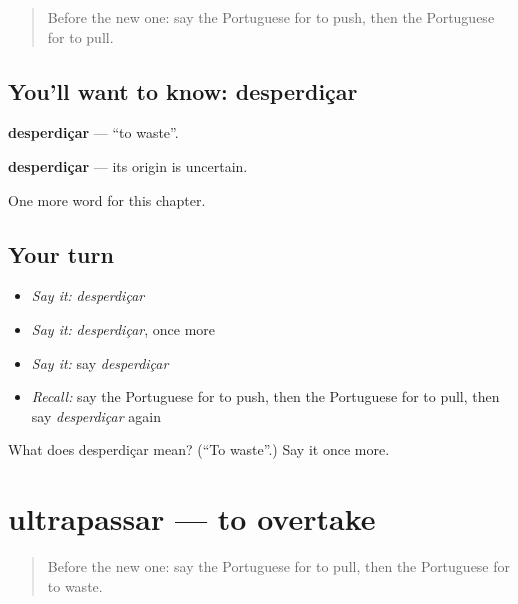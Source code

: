 \label{lesson:PT-C236-desperdicar}



\begin{quote}
Before the new one: say the Portuguese for to push, then the Portuguese for to pull.
\end{quote}

\subsection*{You'll want to know: desperdiçar}
\textbf{desperdiçar} — \textquotedblleft{}to waste\textquotedblright{}.

\begin{cousinweb}
\textbf{desperdiçar} — its origin is uncertain.
\end{cousinweb}

\begin{grammarlens}[title={What you've built}]
One more word for this chapter.
\end{grammarlens}

\subsection*{Your turn}
\begin{itemize}
\raggedright
  \item \emph{Say it:} \emph{desperdiçar}
  \item \emph{Say it:} \emph{desperdiçar}, once more
  \item \emph{Say it:} say \emph{desperdiçar}
  \item \emph{Recall:} say the Portuguese for to push, then the Portuguese for to pull, then say \emph{desperdiçar} again
\end{itemize}

\begin{tcolorbox}[breakable,colback=teal!4,colframe=teal!35!black,title={Before you move on}]
What does desperdiçar mean? (\textquotedblleft{}To waste\textquotedblright{}.) Say it once more.
\end{tcolorbox}
\section[ultrapassar]{ultrapassar — to overtake}

\label{lesson:PT-C236-ultrapassar}



\begin{quote}
Before the new one: say the Portuguese for to pull, then the Portuguese for to waste.
\end{quote}

